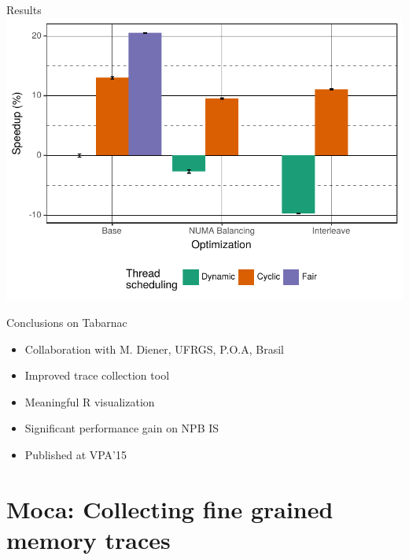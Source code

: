 \documentclass[xcolor={usenames,dvipsnames},hyperref={pdfusetitle}]{beamer}
\begin{document}
\begin{frame}{Results}
    \includegraphics[width=\linewidth]{tabarnac/slides/is_exectime}
\end{frame}


\begin{frame}{Conclusions on Tabarnac}
    \begin{block}{}
        \begin{itemize}
            \item Collaboration with M. Diener, UFRGS, P.O.A, Brasil
            \item Improved trace collection tool
            \item Meaningful R visualization
            \item Significant performance gain on NPB IS
            \item<alert@+-> Published at VPA'15~\cite{Beniamine15TABARNAC}
        \end{itemize}
    \end{block}
\end{frame}

\section{Moca: Collecting fine grained memory traces}
\end{document}
